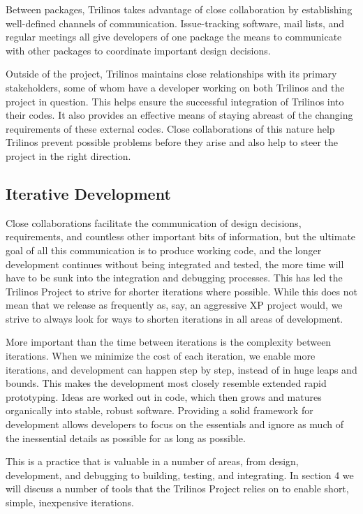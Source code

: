 \documentclass[12pt,relax]{article}
\begin{document}
Between packages, Trilinos takes advantage of close collaboration by 
establishing well-defined channels of communication.  Issue-tracking
software, mail lists, and regular meetings all give developers of one package
the means to communicate with other packages to coordinate important design
decisions.

Outside of the project, Trilinos maintains close relationships with its primary
stakeholders, some of whom have a developer working on both Trilinos and the
project in question.  This helps ensure the successful integration of Trilinos
into their codes.  It also provides an effective means of staying abreast of
the changing requirements of these external codes.  Close collaborations of
this nature help Trilinos prevent possible problems before they arise and also
help to steer the project in the right direction.

\subsection{Iterative Development}

Close collaborations facilitate the communication of design decisions, 
requirements, and countless other important bits of information, but the
ultimate goal of all this communication is to produce working code, and the
longer development continues without being integrated and tested, the more
time will have to be sunk into the integration and debugging processes.  This
has led the Trilinos Project to strive for shorter iterations where possible.
While this does not mean that we release as frequently as, say, an aggressive XP
project would, we strive to always look for ways to shorten iterations in all
areas of development.

More important than the time between iterations is the complexity between
iterations.  When we minimize the cost of each iteration, we enable more
iterations, and development can happen step by step, instead of in huge leaps
and bounds.  This makes the development most closely resemble extended
rapid prototyping.  Ideas are worked out in code, which then grows and matures
organically into stable, robust software.  Providing a solid framework for
development allows developers to focus on the essentials and ignore as much of
the inessential details as possible for as long as possible.

This is a practice that is valuable in a number of areas, from design,
development, and debugging to building, testing, and integrating.  In section 4
we will discuss a number of tools that the Trilinos Project relies on to enable
short, simple, inexpensive iterations.
\end{document}
